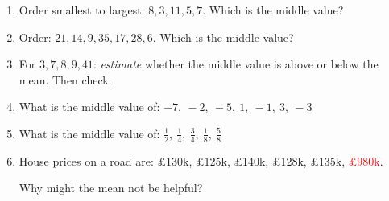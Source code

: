 \documentclass{beamer}
\newcommand{\ashow}[1]{\uncover<2->{\textcolor{red}{\small #1}}}
\begin{document}
\begin{frame}
\begin{columns}[T]
\begin{enumerate}
  \item Order smallest to largest:
  $8,3,11,5,7$.
  Which is the middle value? \ashow{7}

  \item Order:
  $21,14,9,35,17,28,6$.
  Which is the middle value? \ashow{17}

  \item For $3,7,8,9,41$:
  \textit{estimate} whether the middle value is above or below the mean.
  Then check. \ashow{below: median $8$, mean $13.6$}

  \item What is the middle value of:
  $-7,\ -2,\ -5,\ 1,\ -1,\ 3,\ -3$ \ashow{$-2$}

  \item What is the middle value of:
  $\tfrac{1}{2},\ \tfrac{1}{4},\ \tfrac{3}{4},\ \tfrac{1}{8},\ \tfrac{5}{8}$ \ashow{$\frac{1}{2}$}

  \item House prices on a road are:
  \pounds130k,
  \pounds125k,
  \pounds140k,
  \pounds128k,
  \pounds135k,
  \textcolor{red}{\pounds980k}.

  Why might the mean not be helpful? \ashow{the \pounds980k outlier pulls the mean up}

\end{enumerate}

\end{columns}

\end{frame}
\end{document}
